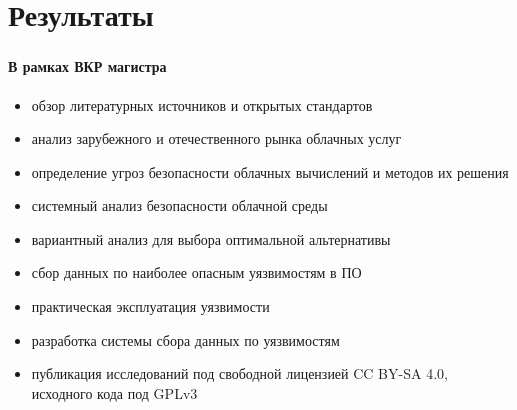
\section{Результаты}

\begin{frame}
\frametitle{\insertsection}
\framesubtitle{В рамках ВКР магистра}

\begin{itemize}
    \item обзор литературных источников и открытых стандартов
    \item анализ зарубежного и отечественного рынка облачных услуг
    \item определение угроз безопасности облачных вычислений и методов их решения
    \item системный анализ безопасности облачной среды
    \item вариантный анализ для выбора оптимальной альтернативы
    \item сбор данных по наиболее опасным уязвимостям в ПО
    \item практическая эксплуатация уязвимости
    \item разработка системы сбора данных по уязвимостям
    \item публикация исследований под свободной лицензией CC BY-SA 4.0, исходного кода под GPLv3
\end{itemize}
\end{frame}

